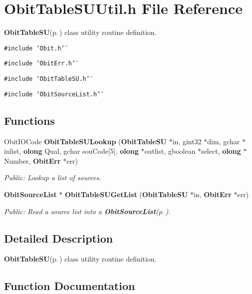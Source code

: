 \section{Obit\-Table\-SUUtil.h File Reference}
\label{ObitTableSUUtil_8h}
{\bf Obit\-Table\-SU}{\rm (p.\,\pageref{structObitTableSU})} class utility routine definition. 

{\tt \#include \char`\"{}Obit.h\char`\"{}}\par
{\tt \#include \char`\"{}Obit\-Err.h\char`\"{}}\par
{\tt \#include \char`\"{}Obit\-Table\-SU.h\char`\"{}}\par
{\tt \#include \char`\"{}Obit\-Source\-List.h\char`\"{}}\par
\subsection*{Functions}
\begin{CompactItemize}
\item 
Obit\-IOCode {\bf Obit\-Table\-SULookup} ({\bf Obit\-Table\-SU} $\ast$in, gint32 $\ast$dim, gchar $\ast$inlist, {\bf olong} Qual, gchar sou\-Code[5], {\bf olong} $\ast$outlist, gboolean $\ast$select, {\bf olong} $\ast$Number, {\bf Obit\-Err} $\ast$err)
\begin{CompactList}\small\item\em Public: Lookup a list of sources. \item\end{CompactList}\item 
{\bf Obit\-Source\-List} $\ast$ {\bf Obit\-Table\-SUGet\-List} ({\bf Obit\-Table\-SU} $\ast$in, {\bf Obit\-Err} $\ast$err)
\begin{CompactList}\small\item\em Public: Read a source list into a {\bf Obit\-Source\-List}{\rm (p.\,\pageref{structObitSourceList})}. \item\end{CompactList}\end{CompactItemize}


\subsection{Detailed Description}
{\bf Obit\-Table\-SU}{\rm (p.\,\pageref{structObitTableSU})} class utility routine definition. 



\subsection{Function Documentation}

